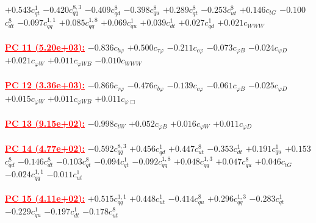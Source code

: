 \documentclass{article}
\begin{document}
{$+0.543$}{\rm $c_{qt}^{1}$} 
{$-0.420$}{\rm $c_{qq}^{8,3}$} 
{$-0.409$}{\rm $c_{qd}^{8}$} 
{$-0.398$}{\rm $c_{qu}^{8}$} 
{$+0.289$}{\rm $c_{qt}^{8}$} 
{$-0.253$}{\rm $c_{ut}^{8}$} 
{$+0.146$}{\rm $c_{tG}$} 
{$-0.100$}{\rm $c_{dt}^{8}$} 
{$-0.097$}{\rm $c_{qq}^{1,1}$} 
{$+0.085$}{\rm $c_{qq}^{1,8}$} 
{$+0.069$}{\rm $c_{qu}^{1}$} 
{$+0.039$}{\rm $c_{dt}^{1}$} 
{$+0.027$}{\rm $c_{qd}^{1}$} 
{$+0.021$}{\rm $c_{WWW}$} 
 \nonumber \\ \nonumber \\ 
\noindent \textcolor{red}{\underline{\bf{PC 11} (5.20e+03):}}
{$-0.836$}{\rm $c_{b \varphi}$} 
{$+0.500$}{\rm $c_{\tau \varphi}$} 
{$-0.211$}{\rm $c_{c \varphi}$} 
{$-0.073$}{\rm $c_{\varphi B}$} 
{$-0.024$}{\rm $c_{\varphi D}$} 
{$+0.021$}{\rm $c_{\varphi W}$} 
{$+0.011$}{\rm $c_{\varphi WB}$} 
{$-0.010$}{\rm $c_{WWW}$} 
 \nonumber \\ \nonumber \\ 
\noindent \textcolor{red}{\underline{\bf{PC 12} (3.36e+03):}}
{$-0.866$}{\rm $c_{\tau \varphi}$} 
{$-0.476$}{\rm $c_{b \varphi}$} 
{$-0.139$}{\rm $c_{c \varphi}$} 
{$-0.061$}{\rm $c_{\varphi B}$} 
{$-0.025$}{\rm $c_{\varphi D}$} 
{$+0.015$}{\rm $c_{\varphi W}$} 
{$+0.011$}{\rm $c_{\varphi WB}$} 
{$+0.011$}{\rm $c_{\varphi \Box}$} 
 \nonumber \\ \nonumber \\ 
\noindent \textcolor{red}{\underline{\bf{PC 13} (9.15e+02):}}
{$-0.998$}{\rm $c_{tW}$} 
{$+0.052$}{\rm $c_{\varphi B}$} 
{$+0.016$}{\rm $c_{\varphi W}$} 
{$+0.011$}{\rm $c_{\varphi D}$} 
 \nonumber \\ \nonumber \\ 
\noindent \textcolor{red}{\underline{\bf{PC 14} (4.77e+02):}}
{$-0.592$}{\rm $c_{qq}^{8,3}$} 
{$+0.456$}{\rm $c_{qd}^{1}$} 
{$+0.447$}{\rm $c_{ut}^{8}$} 
{$-0.353$}{\rm $c_{dt}^{1}$} 
{$+0.191$}{\rm $c_{qu}^{1}$} 
{$+0.153$}{\rm $c_{qd}^{8}$} 
{$-0.146$}{\rm $c_{dt}^{8}$} 
{$-0.103$}{\rm $c_{qt}^{8}$} 
{$-0.094$}{\rm $c_{qt}^{1}$} 
{$-0.092$}{\rm $c_{qq}^{1,8}$} 
{$+0.048$}{\rm $c_{qq}^{1,3}$} 
{$+0.047$}{\rm $c_{qu}^{8}$} 
{$+0.046$}{\rm $c_{tG}$} 
{$-0.024$}{\rm $c_{qq}^{1,1}$} 
{$-0.011$}{\rm $c_{ut}^{1}$} 
 \nonumber \\ \nonumber \\ 
\noindent \textcolor{red}{\underline{\bf{PC 15} (4.11e+02):}}
{$+0.515$}{\rm $c_{qq}^{1,1}$} 
{$+0.448$}{\rm $c_{ut}^{1}$} 
{$-0.414$}{\rm $c_{qu}^{8}$} 
{$+0.296$}{\rm $c_{qq}^{1,3}$} 
{$-0.283$}{\rm $c_{qt}^{1}$} 
{$-0.229$}{\rm $c_{qu}^{1}$} 
{$-0.197$}{\rm $c_{dt}^{1}$} 
{$-0.178$}{\rm $c_{ut}^{8}$} 
\end{document}
